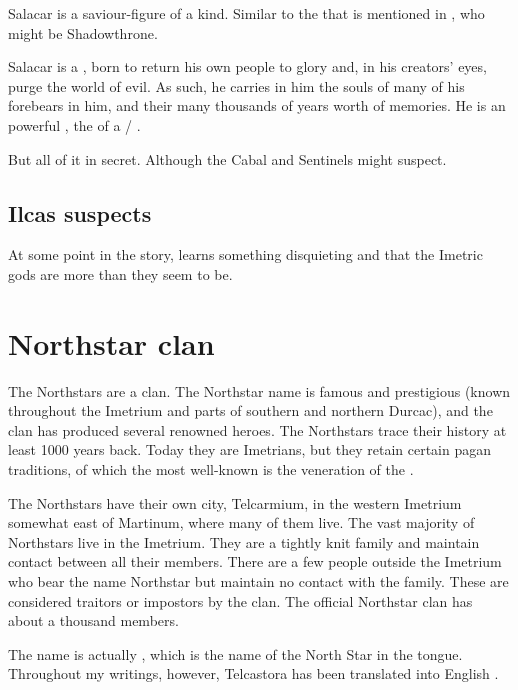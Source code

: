 Salacar is a saviour-figure of a kind. 
Similar to the \human{}  that is mentioned in \cite{StevenErikson:TheBonehunters}, who might be Shadowthrone. 

Salacar is a , born to return his own people to glory and, in his creators' eyes, purge the world of evil. 
As such, he carries in him the souls of many of his forebears in him, and their many thousands of years worth of memories. 
He is an powerful \vertex, the \apex{} of a \cuezcan/\naga{} \matrixx. 

But all of it in secret. 
Although the Cabal and Sentinels might suspect.





\subsection{Ilcas suspects}
At some point in the story,  learns something disquieting and  that the Imetric gods are more than they seem to be. 









\section{Northstar clan}
The Northstars are a \scathaese{} clan. 
The Northstar name is famous and prestigious (known throughout the Imetrium and parts of southern \Velcad{} and northern Durcac), and the clan has produced several renowned heroes. 
The Northstars trace their history at least 1000 years back. 
Today they are Imetrians, but they retain certain pagan traditions, of which the most well-known is the veneration of the . 

The Northstars have their own city, Telcarmium, in the western Imetrium somewhat east of Martinum, where many of them live. The vast majority of Northstars live in the Imetrium. 
They are a tightly knit family and maintain contact between all their members. 
There are a few people outside the Imetrium who bear the name Northstar but maintain no contact with the family. 
These are considered traitors or impostors by the clan. 
The official Northstar clan has about a thousand members. 

The name  is actually , which is the name of the North Star in the \Ortaican{} tongue. 
Throughout my writings, however, Telcastora has been translated into English . 

